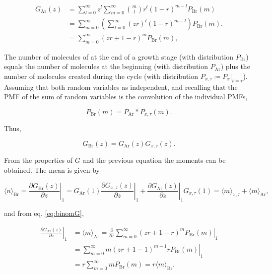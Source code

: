 \begin{equation}
  \label{eq:binomG}
  \begin{split}
    G_\text{Ar}(z) &= \sum_{l=0}^\infty z^l\sum_{m=0}^\infty {m\choose l}r^l(1-r)^{m-l}P_\text{Br}(m)\\
    &= \sum_{m=0}^\infty\left(\sum_{l=0}^\infty (zr)^l(1-r)^{m-l}\right)P_\text{Br}(m).\\
    &= \sum_{m=0}^\infty(zr+1-r)^{m}P_\text{Br}(m),
  \end{split}
\end{equation}

The number of molecules of at the end of a growth stage (with distribution $P_\text{Br}$) equals the number of molecules at the beginning (with distribution $P_\text{Ar}$) plus the number of molecules created during the cycle (with distribution $P_{x,\tau} \coloneqq P_x|_{t=\tau}$). Assuming that both random variables as independent, and recalling that the PMF of the sum of random variables is the convolution of the individual PMFs,

\begin{equation*}
  P_\text{Br}(m) = P_\text{Ar}\ast P_{x,\tau}(m).
\end{equation*}

Thus,

\begin{equation*}
  G_\text{Br}(z) = G_\text{Ar}(z)G_{x,\tau}(z).
\end{equation*}

From the properties of $G$ and the previous equation the moments can be obtained. The mean is given by

\begin{equation}
  \label{eq:bur-aveBr}
  \langle n\rangle_\text{Br} = \left.\frac{\partial G_\text{Br}(z)}{\partial z}\right|_1 = G_\text{Ar}(1)\left.\frac{\partial G_{x,\tau}(z)}{\partial z}\right|_1 + \left.\frac{\partial G_\text{Ar}(z)}{\partial z}\right|_1G_{x,\tau}(1) = \langle m\rangle_{x,\tau} + \langle m\rangle_\text{Ar},
\end{equation}

and from eq. \eqref{eq:binomG},

\begin{equation*}
  \begin{split}
  \left.\frac{\partial G_\text{Ar}(z)}{\partial z}\right|_1 &= \langle m\rangle_\text{Ar} = \left.\frac{\partial}{\partial z} \sum_{m=0}^\infty(zr+1-r)^mP_\text{Br}(m)\right|_1\\
&= \left.\sum_{m=0}^\infty m(zr+1-1)^{m-1}rP_\text{Br}(m)\right|_1\\
&= r\sum_{m=0}^\infty mP_\text{Br}(m) = r\langle m\rangle_\text{Br}.
  \end{split}
\end{equation*}
  
